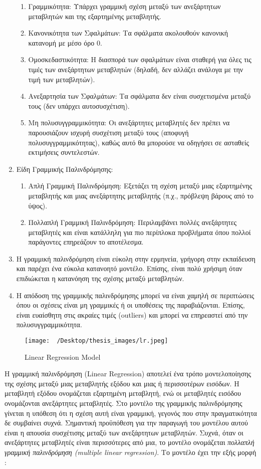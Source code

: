 \documentclass[diploma]{softlab-thesis}
\begin{document}
\begin{enumerate}
\begin{enumerate}
\item{Γραμμικότητα}: Υπάρχει γραμμική σχέση μεταξύ των ανεξάρτητων μεταβλητών και της εξαρτημένης μεταβλητής.
\item{Κανονικότητα των Σφαλμάτων}: Τα σφάλματα ακολουθούν κανονική κατανομή με μέσο όρο 0.
\item{Ομοσκεδαστικότητα}: Η διασπορά των σφαλμάτων είναι σταθερή για όλες τις τιμές των ανεξάρτητων μεταβλητών (δηλαδή, δεν αλλάζει ανάλογα με την τιμή των μεταβλητών).
\item{Ανεξαρτησία των Σφαλμάτων}: Τα σφάλματα δεν είναι συσχετισμένα μεταξύ τους (δεν υπάρχει αυτοσυσχέτιση).
\item{Μη πολυσυγγραμμικότητα}: Οι ανεξάρτητες μεταβλητές δεν πρέπει να παρουσιάζουν ισχυρή συσχέτιση μεταξύ τους (αποφυγή πολυσυγγραμμικότητας), καθώς αυτό θα μπορούσε να οδηγήσει σε ασταθείς εκτιμήσεις συντελεστών.
\end{enumerate}
\item Είδη Γραμμικής Παλινδρόμησης: \begin{enumerate}
\item{Απλή Γραμμική Παλινδρόμηση}: Εξετάζει τη σχέση μεταξύ μιας εξαρτημένης μεταβλητής και μιας ανεξάρτητης μεταβλητής (π.χ., πρόβλεψη βάρους από το ύψος).
\item{Πολλαπλή Γραμμική Παλινδρόμηση}: Περιλαμβάνει πολλές ανεξάρτητες μεταβλητές και είναι κατάλληλη για πιο περίπλοκα προβλήματα όπου πολλοί παράγοντες επηρεάζουν το αποτέλεσμα. \end{enumerate}
\item Η γραμμική παλινδρόμηση είναι εύκολη στην ερμηνεία, γρήγορη στην εκπαίδευση και παρέχει ένα εύκολα κατανοητό μοντέλο. Επίσης, είναι πολύ χρήσιμη όταν επιδιώκεται η κατανόηση της σχέσης μεταξύ μεταβλητών.
\item Η απόδοση της γραμμικής παλινδρόμησης μπορεί να είναι χαμηλή σε περιπτώσεις όπου οι σχέσεις είναι μη γραμμικές ή οι υποθέσεις της παραβιάζονται. Επίσης, είναι ευαίσθητη στις ακραίες τιμές (outliers) και μπορεί να επηρεαστεί από την πολυσυγγραμμικότητα.
\end{enumerate}

\begin{figure}[h]
    \centering
    \texttt{[image: ~/Desktop/thesis\_images/lr.jpeg]} %
    \caption{Linear Regression Model}
    \label{fig:your_image_label}
\end{figure}


Η γραμμική παλινδρόμηση (Linear Regression) αποτελεί ένα τρόπο μοντελοποίησης της σχέσης μεταξύ μιας μεταβλητής εξόδου και μιας ή περισσοτέρων εισόδων. Η μεταβλητή εξόδου ονομάζεται εξαρτημένη μεταβλητή, ενώ οι μεταβλητές εισόδου ονομάζονται ανεξάρτητες μεταβλητές. Στο μοντέλο της γραμμικής παλινδρόμησης γίνεται η υπόθεση ότι η σχέση αυτή είναι γραμμική, γεγονός που στην πραγματικότητα δε συμβαίνει συχνά.
Σημαντική προϋπόθεση για την παραγωγή του μοντέλου αυτού είναι η απουσία συσχέτισης μεταξύ των ανεξάρτητων μεταβλητών. Συχνά, όταν οι ανεξάρτητες μεταβλητές είναι περισσότερες από μια, το μοντέλο ονομάζεται \textit{πολλαπλή γραμμική παλινδρόμηση (multiple linear regression)}. Το μοντέλο έχει την εξής μορφή : \vspace{1cm}
\end{document}
